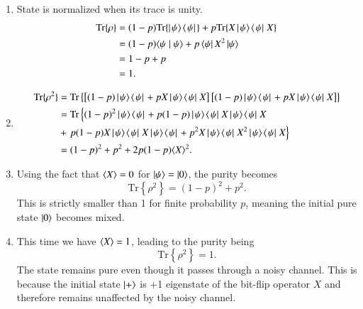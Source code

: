 \begin{solution}
\begin{enumerate}[label=(\alph*)]
    \item State is normalized when its trace is unity.
    \begin{align*}
        \text{Tr}\{\rho\} & = (1 - p) \text{Tr}\{\left|\left. \psi \rangle\right.\!\langle\left. \psi \right|\right. \} + p \text{Tr}\{X\left|\left. \psi \rangle\right.\!\langle\left. \psi \right|\right. X\} \\
        & = (1 - p) \langle \psi \mid \psi \rangle + p \left\langle \psi \right| X^2 \left| \psi \right\rangle \\
        & = 1 - p + p \\
        & = 1.
    \end{align*}
    \item 
    \begin{align*}
        \text{Tr}\{\rho^2\} & = \text{Tr}\left\{ \left[ (1 - p) \outp{\psi}{\psi} + p X\outp{\psi}{\psi}X \right] \left[ (1 - p) \outp{\psi}{\psi} + p X\outp{\psi}{\psi}X \right] \right\} \\
        & = \text{Tr}\left\{ (1-p)^2\outp{\psi}{\psi} +p(1-p)\outp{\psi}{\psi}X\outp{\psi}{\psi}X \right. \\
        & + \left. p(1-p)X\outp{\psi}{\psi}X\outp{\psi}{\psi} + p^2 X\outp{\psi}{\psi}X^2\outp{\psi}{\psi}X \right\} \\
        & = (1-p)^2 + p^2 + 2p(1-p)\av{X}^2.
    \end{align*}
    \item Using the fact that $\langle X \rangle=0$ for $\left| \psi \right\rangle=\left| 0 \right\rangle$, the purity becomes
    \begin{equation*}
        \text{Tr}\left\{\rho^2\right\} = (1-p)^2 + p^2.
    \end{equation*}
    This is strictly smaller than 1 for finite probability $p$, meaning the initial pure state $\left| 0 \right\rangle$ becomes mixed.
    \item This time we have $\langle X \rangle=1$, leading to the purity being
    \begin{equation*}
        \text{Tr}\left\{\rho^2\right\} = 1.
    \end{equation*}
    The state remains pure even though it passes through a noisy channel. This is because the initial state $\left| + \right\rangle$ is +1 eigenstate of the bit-flip operator $X$ and therefore remains unaffected by the noisy channel.
\end{enumerate}
\end{solution}

